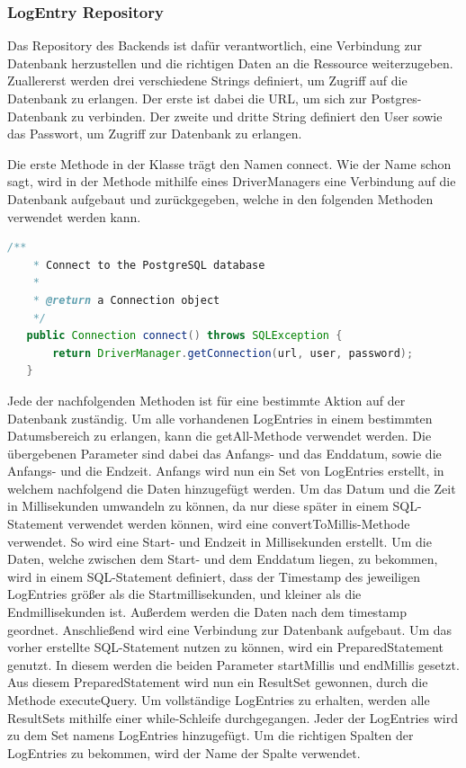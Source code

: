 \subsubsection{LogEntry Repository}
Das Repository des Backends ist dafür verantwortlich, eine Verbindung zur Datenbank herzustellen und die richtigen Daten an die Ressource weiterzugeben. Zuallererst werden drei verschiedene Strings definiert, um Zugriff auf die Datenbank zu erlangen. Der erste ist dabei die URL, um sich zur Postgres-Datenbank zu verbinden. Der zweite und dritte String definiert den User sowie das Passwort, um Zugriff zur Datenbank zu erlangen. 

Die erste Methode in der Klasse trägt den Namen connect. Wie der Name schon sagt, wird in der Methode mithilfe eines DriverManagers eine Verbindung auf die Datenbank aufgebaut und zurückgegeben, welche in den folgenden Methoden verwendet werden kann. 

\begin{lstlisting}[language=java,caption=Connect to SQL Database,label=lst:impl:connect]
    /**
    * Connect to the PostgreSQL database
    *
    * @return a Connection object
    */
   public Connection connect() throws SQLException {
       return DriverManager.getConnection(url, user, password);
   }   
\end{lstlisting}

Jede der nachfolgenden Methoden ist für eine bestimmte Aktion auf der Datenbank zuständig. 
Um alle vorhandenen LogEntries in einem bestimmten Datumsbereich zu erlangen, kann die getAll-Methode verwendet werden. Die übergebenen Parameter sind dabei das Anfangs- und das Enddatum, sowie die Anfangs- und die Endzeit. Anfangs wird nun ein Set von LogEntries erstellt, in welchem nachfolgend die Daten hinzugefügt werden. Um das Datum und die Zeit in Millisekunden umwandeln zu können, da nur diese später in einem SQL-Statement verwendet werden können, wird eine convertToMillis-Methode verwendet. So wird eine Start- und Endzeit in Millisekunden erstellt. 
Um die Daten, welche zwischen dem Start- und dem Enddatum liegen, zu bekommen, wird in einem SQL-Statement definiert, dass der Timestamp des jeweiligen LogEntries größer als die Startmillisekunden, und kleiner als die Endmillisekunden ist. Außerdem werden die Daten nach dem timestamp geordnet. Anschließend wird eine Verbindung zur Datenbank aufgebaut. Um das vorher erstellte SQL-Statement nutzen zu können, wird ein PreparedStatement genutzt. In diesem werden die beiden Parameter startMillis und endMillis gesetzt. Aus diesem PreparedStatement wird nun ein ResultSet gewonnen, durch die Methode executeQuery. Um vollständige LogEntries zu erhalten, werden alle ResultSets mithilfe einer while-Schleife durchgegangen. Jeder der LogEntries wird zu dem Set namens LogEntries hinzugefügt. Um die richtigen Spalten der LogEntries zu bekommen, wird der Name der Spalte verwendet. 

